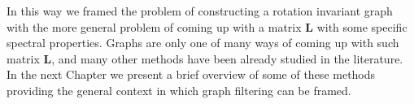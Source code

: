 In this way we framed the problem of constructing a rotation invariant graph with the more general problem of coming up with a matrix $\mathbf L$ with some specific spectral properties. Graphs are only one of many ways of coming up with such matrix $\mathbf L$, and many other methods have been already studied in the literature. In the next Chapter we present a brief overview of some of these methods providing the general context in which graph filtering can be framed.
